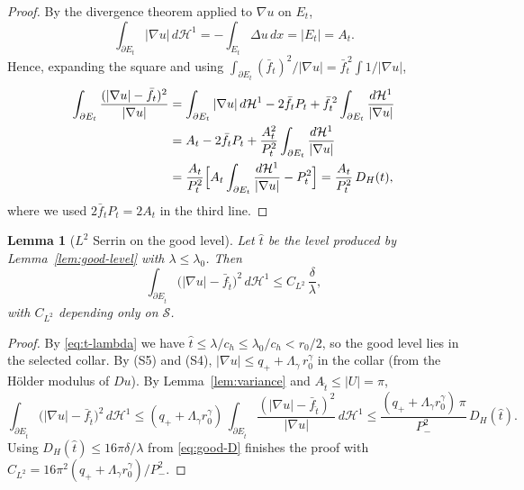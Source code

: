 \documentclass[11pt]{amsart}
\newtheorem{lemma}[theorem]{Lemma}
\newcommand{\Et}{E_{\hat t}}
\newcommand{\HH}{\mathcal H}
\newcommand{\Sclass}{\mathcal S}
\begin{document}
\begin{proof}
By the divergence theorem applied to \(\nabla u\) on \(E_t\),
\[
   \int_{\partial E_t}|\nabla u|\,d\HH^1
      =-\int_{E_t}\Delta u\,dx=|E_t|=A_t.
\]
Hence, expanding the square and using \(\int_{\partial E_t}
(\bar f_t)^2/|\nabla u|=\bar f_t^{\,2}\int 1/|\nabla u|\),
\[
\begin{aligned}
\int_{\partial E_t}\frac{(|\nabla u|-\bar f_t)^2}{|\nabla u|}
   &=
   \int_{\partial E_t}|\nabla u|\,d\HH^1
   -2\bar f_t P_t
   +\bar f_t^{\,2}\int_{\partial E_t}\frac{d\HH^1}{|\nabla u|}\\
   &=A_t-2\bar f_t P_t
     +\frac{A_t^2}{P_t^2}\int_{\partial E_t}\frac{d\HH^1}{|\nabla u|}\\
   &=\frac{A_t}{P_t^2}
     \Bigl[A_t\int_{\partial E_t}\frac{d\HH^1}{|\nabla u|}-P_t^2\Bigr]
   =\frac{A_t}{P_t^2}\,D_H(t),
\end{aligned}
\]
where we used \(2\bar f_t P_t=2A_t\) in the third line.
\end{proof}

\begin{lemma}[\(L^2\) Serrin on the good level]\label{lem:L2}
Let \(\hat t\) be the level produced by Lemma~\ref{lem:good-level} with
\(\lambda\le\lambda_0\).  Then
\begin{equation}\label{eq:L2-serrin}
   \int_{\partial \Et}
      \bigl(|\nabla u|-\bar f_{\hat t}\bigr)^2\,d\HH^1
      \le
   C_{L^2}\,\frac{\delta}{\lambda},
\end{equation}
with \(C_{L^2}\) depending only on \(\Sclass\).
\end{lemma}

\begin{proof}
By \eqref{eq:t-lambda} we have \(\hat t\le\lambda/c_h\le\lambda_0/c_h<
r_0/2\), so the good level lies in the selected collar.  By (S5) and
(S4), $|\nabla u|\le q_++\Lambda_\gamma\,r_0^\gamma$ in the collar
(from the Hölder modulus of $Du$).  By Lemma~\ref{lem:variance} and
$A_{\hat t}\le|U|=\pi$,
\[
   \int_{\partial\Et}
      \bigl(|\nabla u|-\bar f_{\hat t}\bigr)^2\,d\HH^1
      \le
   (q_++\Lambda_\gamma r_0^\gamma)\,
   \int_{\partial\Et}
      \frac{(|\nabla u|-\bar f_{\hat t})^2}{|\nabla u|}\,d\HH^1
      \le
   \frac{(q_++\Lambda_\gamma r_0^\gamma)\,\pi}{P_-^2}\,D_H(\hat t).
\]
Using \(D_H(\hat t)\le 16\pi\delta/\lambda\) from \eqref{eq:good-D}
finishes the proof with
$C_{L^2}=16\pi^2(q_++\Lambda_\gamma r_0^\gamma)/P_-^2$.
\end{proof}
\end{document}
